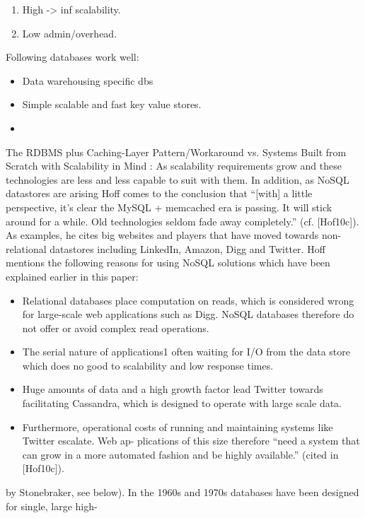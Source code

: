 \documentclass[a4paper,10pt,titlepage=false]{scrreprt}
\begin{document}
\begin{description}
\item[Cloud Computing] \begin{enumerate}
  \item High -> inf scalability. 
  \item Low admin/overhead.
\end{enumerate}
Following databases work well:
\begin{itemize}
  \item Data warehousing specific dbs
  \item Simple scalable and fast key value stores.
 \item %
\end{itemize}
\item The RDBMS plus Caching-Layer Pattern/Workaround vs. Systems Built from Scratch with Scalability in Mind : As scalability requirements grow and these technologies are less and less capable to suit with them. In
addition, as NoSQL datastores are arising Hoff comes to the conclusion that “[with] a little perspective,
it's clear the MySQL + memcached era is passing. It will stick around for a while. Old technologies
seldom fade away completely.” (cf. [Hof10c]). As examples, he cites big websites and players that have
moved towards non-relational datastores including LinkedIn, Amazon, Digg and Twitter. Hoff mentions
the following reasons for using NoSQL solutions which have been explained earlier in this paper:
\begin{itemize}
  \item  Relational databases place computation on reads, which is considered wrong for large-scale web
applications such as Digg. NoSQL databases therefore do not offer or avoid complex read operations.
\item The serial nature of applications1 often waiting for I/O from the data store which does no good to
scalability and low response times.
\item  Huge amounts of data and a high growth factor lead Twitter towards facilitating Cassandra, which
is designed to operate with large scale data.
\item  Furthermore, operational costs of running and maintaining systems like Twitter escalate. Web ap-
plications of this size therefore “need a system that can grow in a more automated fashion and be
highly available.” (cited in [Hof10c]).
\end{itemize}
\item[Yesterday vs Today]by Stonebraker, see below). In the 1960s and 1970s databases have been designed for single, large high-

\end{description}
\end{document}
